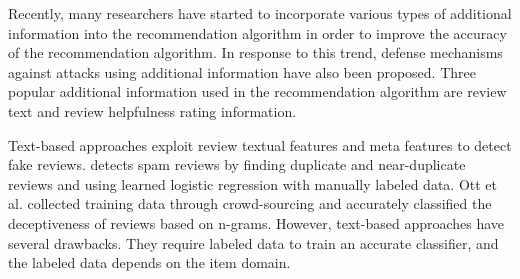 \documentclass[master,english,final]{kaist-ucs}
\begin{document}
Recently, many researchers have started to incorporate various types of additional information into the recommendation algorithm in order to improve the accuracy of the recommendation algorithm.
In response to this trend, defense mechanisms against attacks using additional information have also been proposed.
Three popular additional information used in the recommendation algorithm are review text and review helpfulness rating information.

Text-based approaches \cite{text_duplicate, text_crowd,text_opinion_summarization,naive_helpfulness} exploit review textual features and meta features to detect fake reviews.
\cite{text_duplicate} detects spam reviews by finding duplicate and near-duplicate reviews and using learned logistic regression with manually labeled data.
Ott et al. \cite{text_crowd} collected training data through crowd-sourcing and accurately classified the deceptiveness of reviews based on n-grams.
However, text-based approaches have several drawbacks.
They require labeled data to train an accurate classifier, and the labeled data depends on the item domain.

%
\end{document}
